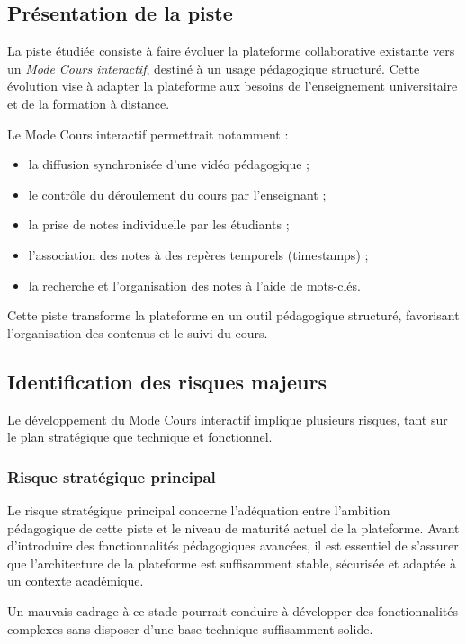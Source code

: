 \documentclass[12pt,a4paper]{report}
\begin{document}
\subsection{Présentation de la piste}

La piste étudiée consiste à faire évoluer la plateforme collaborative existante
vers un \textit{Mode Cours interactif}, destiné à un usage pédagogique structuré.
Cette évolution vise à adapter la plateforme aux besoins de l’enseignement
universitaire et de la formation à distance.

Le Mode Cours interactif permettrait notamment :
\begin{itemize}
  \item la diffusion synchronisée d’une vidéo pédagogique ;
  \item le contrôle du déroulement du cours par l’enseignant ;
  \item la prise de notes individuelle par les étudiants ;
  \item l’association des notes à des repères temporels (timestamps) ;
  \item la recherche et l’organisation des notes à l’aide de mots-clés.
\end{itemize}

Cette piste transforme la plateforme en un outil pédagogique structuré,
favorisant l’organisation des contenus et le suivi du cours.

\subsection{Identification des risques majeurs}

Le développement du Mode Cours interactif implique plusieurs risques,
tant sur le plan stratégique que technique et fonctionnel.

\subsubsection{Risque stratégique principal}

Le risque stratégique principal concerne l’adéquation entre l’ambition
pédagogique de cette piste et le niveau de maturité actuel de la plateforme.
Avant d’introduire des fonctionnalités pédagogiques avancées, il est essentiel
de s’assurer que l’architecture de la plateforme est suffisamment stable,
sécurisée et adaptée à un contexte académique.

Un mauvais cadrage à ce stade pourrait conduire à développer des fonctionnalités
complexes sans disposer d’une base technique suffisamment solide.
\end{document}
